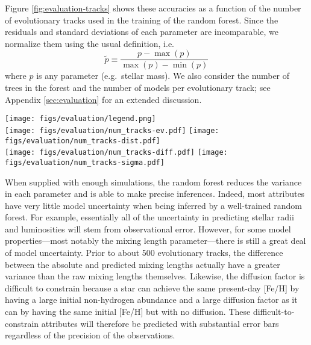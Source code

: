 \documentclass[twocolumn,twocolappendix]{aastex6}
\begin{document}
Figure \ref{fig:evaluation-tracks} shows these accuracies as a function of the number of evolutionary tracks used in the training of the random forest. Since the residuals and standard deviations of each parameter are incomparable, we normalize them using the usual definition, i.e.\
\begin{equation}
  \tilde p \equiv \frac{p - \max(p)}{\max(p)-\min(p)}
\end{equation}
where $p$ is any parameter (e.g.\ stellar mass). We also consider the number of trees in the forest and the number of models per evolutionary track; see Appendix \ref{sec:evaluation} for an extended discussion.

\begin{figure*}
    \centering
    \texttt{[image: figs/evaluation/legend.png]}\\
    \texttt{[image: figs/evaluation/num\_tracks-ev.pdf]}\hfill
    \texttt{[image: figs/evaluation/num\_tracks-dist.pdf]}\\
    \texttt{[image: figs/evaluation/num\_tracks-diff.pdf]}\hfill
    \texttt{[image: figs/evaluation/num\_tracks-sigma.pdf]}\\
    \caption{Evaluations of model accuracy. Explained variance (top left), accuracy per precision distance (top right), normalized absolute error (bottom left), and normalized model uncertainty (bottom right) for each stellar parameter as a function of the number of evolutionary tracks used in training the random forest. } 
    \label{fig:evaluation-tracks}
\end{figure*}

When supplied with enough simulations, the random forest reduces the variance in each parameter and is able to make precise inferences. Indeed, most attributes have very little model uncertainty when being inferred by a well-trained random forest. For example, essentially all of the uncertainty in predicting stellar radii and luminosities will stem from observational error. However, for some model properties---most notably the mixing length parameter---there is still a great deal of model uncertainty. Prior to about 500 evolutionary tracks, the difference between the absolute and predicted mixing lengths actually have a greater variance than the raw mixing lengths themselves. Likewise, the diffusion factor is difficult to constrain because a star can achieve the same present-day [Fe/H] by having a large initial non-hydrogen abundance and a large diffusion factor as it can by having the same initial [Fe/H] but with no diffusion. These difficult-to-constrain attributes will therefore be predicted with substantial error bars regardless of the precision of the observations. 
\end{document}
